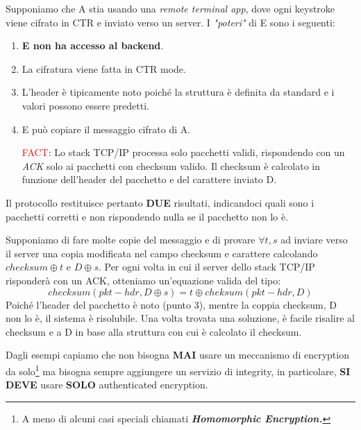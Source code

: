 \begin{example}Supponiamo che A stia usando una \textit{remote terminal app}, dove ogni keystroke viene cifrato in CTR e inviato verso un server. I \textit{"poteri"} di E sono i seguenti:
\begin{enumerate}
    \item \textbf{E non ha accesso al backend}.
    \item La cifratura viene fatta in CTR mode.
    \item L'header è tipicamente noto poiché la struttura è definita da standard e i valori possono essere predetti.
    \item E può copiare il messaggio cifrato di A.
    \item [\textcolor{red}{FACT}:]Lo stack TCP/IP processa solo pacchetti validi, rispondendo con un \textit{ACK} solo ai pacchetti con checksum valido. Il checksum è calcolato in funzione dell'header del pacchetto e del carattere inviato D.
\end{enumerate}
\begin{remark}
Il protocollo restituisce pertanto \textbf{DUE} risultati, indicandoci quali sono i pacchetti corretti e non rispondendo nulla se il pacchetto non lo è.
\end{remark}
Supponiamo di fare molte copie del messaggio e di provare $\forall{t,s}$ ad inviare verso il server una copia modificata nel campo checksum e carattere calcolando $checksum\oplus{t}$ e $D\oplus{s}$. Per ogni volta in cui il server dello stack TCP/IP risponderà con un ACK, otteniamo un'equazione valida del tipo:
\[checksum(pkt-hdr,D\oplus{s})=t\oplus{cheksum(pkt-hdr, D)}\]
Poiché l'header del pacchetto è noto (punto 3), mentre la coppia {checksum, D} non lo è, il sistema è risolubile. Una volta trovata una soluzione, è facile risalire al checksum e a D in base alla struttura con cui è calcolato il checksum. 
\end{example}
\begin{remark}
Dagli esempi capiamo che non bisogna \textbf{MAI} usare un meccanismo di encryption da solo\footnote{A meno di alcuni casi speciali chiamati \textit{\textbf{Homomorphic Encryption.}}} ma bisogna sempre aggiungere un servizio di integrity, in particolare, \textbf{SI DEVE} usare \textbf{SOLO} authenticated encryption.
\end{remark}
